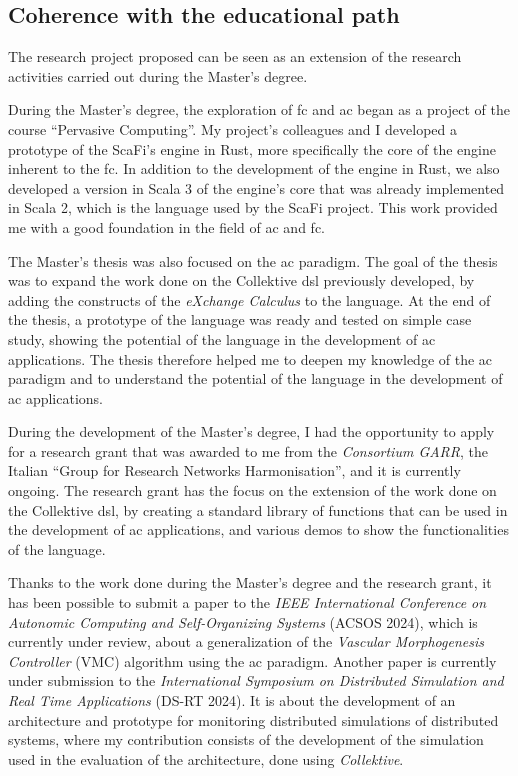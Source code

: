 \documentclass[12pt, a4paper]{article}
\newcommand{\note}[3]{\todo[inline,linecolor=#1,backgroundcolor=#1!25,bordercolor=#1]{\textbf{#2:} #3}}
\newcommand{\angela}[1]{\note{blue}{Angela}{#1}}
\begin{document}
\subsection{Coherence with the educational path}\label{subsec:coherence-with-the-educational-path}

The research project proposed can be seen as an extension of the research activities carried out during the Master's degree.

During the Master's degree, the exploration of \ac{fc} and \ac{ac} began as a project of the course ``Pervasive Computing''.
%
My project's colleagues and I developed a prototype of the ScaFi's engine in Rust,
more specifically the core of the engine inherent to the \ac{fc}.
%
In addition to the development of the engine in Rust,
we also developed a version in Scala 3 of the engine's core that was already implemented in Scala 2,
which is the language used by the ScaFi project.
%
This work provided me with a good foundation in the field of \ac{ac} and \ac{fc}.

The Master's thesis was also focused on the \ac{ac} paradigm.
%
The goal of the thesis was to expand the work done on the Collektive \ac{dsl} previously developed,
by adding the constructs of the \emph{eXchange Calculus} to the language. \angela{todo explain xc and collektive?}
%
At the end of the thesis, a prototype of the language was ready and tested on simple case study,
showing the potential of the language in the development of \ac{ac} applications.
%
The thesis therefore helped me to deepen my knowledge of the \ac{ac} paradigm and to understand the potential
of the language in the development of \ac{ac} applications.

During the development of the Master's degree,
I had the opportunity to apply for a research grant that was awarded to me from the \emph{Consortium GARR},
the Italian ``Group for Research Networks Harmonisation'',
and it is currently ongoing.
%
The research grant has the focus on the extension of the work done on the Collektive \ac{dsl},
by creating a standard library of functions that can be used in the development of \ac{ac} applications,
and various demos to show the functionalities of the language.

Thanks to the work done during the Master's degree and the research grant,
it has been possible to submit a paper to the \emph{IEEE International Conference on Autonomic Computing and Self-Organizing Systems} (ACSOS 2024),
which is currently under review,
about a generalization of the \emph{Vascular Morphogenesis Controller} (VMC) algorithm using the \ac{ac} paradigm.
%
Another paper is currently under submission to the \emph{International Symposium on Distributed Simulation and Real Time Applications} (DS-RT 2024).
%
It is about the development of an architecture and prototype for monitoring distributed simulations of distributed systems,
where my contribution consists of the development of the simulation used in the evaluation of the architecture,
done using \emph{Collektive}.
\end{document}
